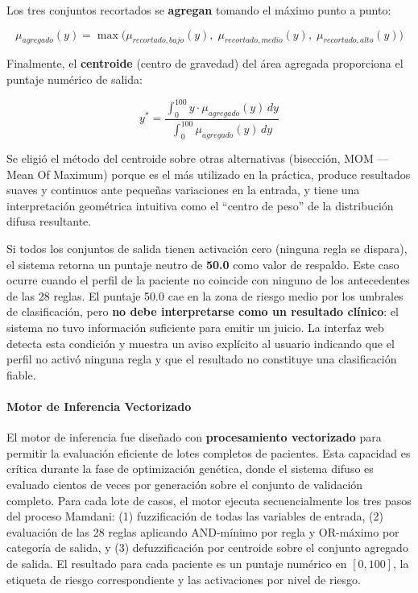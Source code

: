 \documentclass[11pt]{article}
\begin{document}
Los tres conjuntos recortados se \textbf{agregan} tomando el m\'aximo punto a punto:

\begin{equation}
    \mu_{agregado}(y) = \max\bigl(\mu_{recortado,bajo}(y),\; \mu_{recortado,medio}(y),\; \mu_{recortado,alto}(y)\bigr)
\end{equation}

Finalmente, el \textbf{centroide} (centro de gravedad) del \'area agregada proporciona el puntaje num\'erico de salida:

\begin{equation}
    y^* = \frac{\int_0^{100} y \cdot \mu_{agregado}(y)\, dy}{\int_0^{100} \mu_{agregado}(y)\, dy}
    \label{eq:centroide}
\end{equation}

Se eligi\'o el m\'etodo del centroide sobre otras alternativas (bisecci\'on, MOM --- Mean Of Maximum) porque es el m\'as utilizado en la pr\'actica, produce resultados suaves y continuos ante peque\~nas variaciones en la entrada, y tiene una interpretaci\'on geom\'etrica intuitiva como el ``centro de peso'' de la distribuci\'on difusa resultante.

Si todos los conjuntos de salida tienen activaci\'on cero (ninguna regla se dispara), el sistema retorna un puntaje neutro de \textbf{50.0} como valor de respaldo. Este caso ocurre cuando el perfil de la paciente no coincide con ninguno de los antecedentes de las 28 reglas. El puntaje 50.0 cae en la zona de riesgo medio por los umbrales de clasificaci\'on, pero \textbf{no debe interpretarse como un resultado cl\'inico}: el sistema no tuvo informaci\'on suficiente para emitir un juicio. La interfaz web detecta esta condici\'on y muestra un aviso expl\'icito al usuario indicando que el perfil no activ\'o ninguna regla y que el resultado no constituye una clasificaci\'on fiable.


\paragraph{Motor de Inferencia Vectorizado}

El motor de inferencia fue dise\~nado con \textbf{procesamiento vectorizado} para permitir la evaluaci\'on eficiente de lotes completos de pacientes. Esta capacidad es cr\'itica durante la fase de optimizaci\'on gen\'etica, donde el sistema difuso es evaluado cientos de veces por generaci\'on sobre el conjunto de validaci\'on completo. Para cada lote de casos, el motor ejecuta secuencialmente los tres pasos del proceso Mamdani: (1) fuzzificaci\'on de todas las variables de entrada, (2) evaluaci\'on de las 28 reglas aplicando AND-m\'inimo por regla y OR-m\'aximo por categor\'ia de salida, y (3) defuzzificaci\'on por centroide sobre el conjunto agregado de salida. El resultado para cada paciente es un puntaje num\'erico en $[0, 100]$, la etiqueta de riesgo correspondiente y las activaciones por nivel de riesgo.
\end{document}
